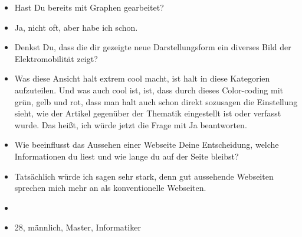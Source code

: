 {\begin{itemize}[]
                  Also ich fand das mit diesen Graphen tatsächlich recht interessant.
                  Das müsste aber halt noch visuell irgendwie ein bisschen mehr zugänglich gemacht werden, denke ich.
                  Aber ansonsten finde ich das ziemlich cool, dass man halt über diese Graphen recht schnell zu irgendwelchen Artikeln kommt.
                  Ja, und wenn die Knoten, die noch keine Betitelung hatten, wenn die sozusagen auch noch eine Betitelung bekommen würden, dann wäre die Navigation durch diesen ganzen Graphen noch intuitiver und einfacher.
            \item {} Hast Du bereits mit Graphen gearbeitet?
            \item {} Ja, nicht oft, aber habe ich schon.
            \item {} Denkst Du, dass die dir gezeigte neue Darstellungsform ein diverses Bild der Elektromobilität zeigt?
            \item {} Was diese Ansicht halt extrem cool macht, ist halt in diese Kategorien aufzuteilen.
                  Und was auch cool ist, ist, dass durch dieses Color-coding mit grün, gelb und rot, dass man halt auch schon direkt sozusagen die Einstellung sieht, wie der Artikel gegenüber der Thematik eingestellt ist oder verfasst wurde.
                  Das heißt, ich würde jetzt die Frage mit Ja beantworten.
            \item {} Wie beeinflusst das Aussehen einer Webseite Deine Entscheidung, welche Informationen du liest und wie lange du auf der Seite bleibst?
            \item {} Tatsächlich würde ich sagen sehr stark, denn gut aussehende Webseiten sprechen mich mehr an als konventionelle Webseiten.
            \item {}
            \item {} 28, männlich, Master, Informatiker
      \end{itemize}}
\nolinenumbers
